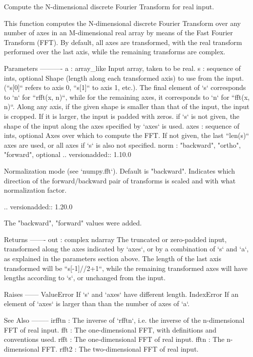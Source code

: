 \begin{DoxyVerb}Compute the N-dimensional discrete Fourier Transform for real input.

This function computes the N-dimensional discrete Fourier Transform over
any number of axes in an M-dimensional real array by means of the Fast
Fourier Transform (FFT).  By default, all axes are transformed, with the
real transform performed over the last axis, while the remaining
transforms are complex.

Parameters
----------
a : array_like
    Input array, taken to be real.
s : sequence of ints, optional
    Shape (length along each transformed axis) to use from the input.
    (``s[0]`` refers to axis 0, ``s[1]`` to axis 1, etc.).
    The final element of `s` corresponds to `n` for ``rfft(x, n)``, while
    for the remaining axes, it corresponds to `n` for ``fft(x, n)``.
    Along any axis, if the given shape is smaller than that of the input,
    the input is cropped.  If it is larger, the input is padded with zeros.
    if `s` is not given, the shape of the input along the axes specified
    by `axes` is used.
axes : sequence of ints, optional
    Axes over which to compute the FFT.  If not given, the last ``len(s)``
    axes are used, or all axes if `s` is also not specified.
norm : {"backward", "ortho", "forward"}, optional
    .. versionadded:: 1.10.0

    Normalization mode (see `numpy.fft`). Default is "backward".
    Indicates which direction of the forward/backward pair of transforms
    is scaled and with what normalization factor.

    .. versionadded:: 1.20.0

        The "backward", "forward" values were added.

Returns
-------
out : complex ndarray
    The truncated or zero-padded input, transformed along the axes
    indicated by `axes`, or by a combination of `s` and `a`,
    as explained in the parameters section above.
    The length of the last axis transformed will be ``s[-1]//2+1``,
    while the remaining transformed axes will have lengths according to
    `s`, or unchanged from the input.

Raises
------
ValueError
    If `s` and `axes` have different length.
IndexError
    If an element of `axes` is larger than than the number of axes of `a`.

See Also
--------
irfftn : The inverse of `rfftn`, i.e. the inverse of the n-dimensional FFT
     of real input.
fft : The one-dimensional FFT, with definitions and conventions used.
rfft : The one-dimensional FFT of real input.
fftn : The n-dimensional FFT.
rfft2 : The two-dimensional FFT of real input.


\end{DoxyVerb}

